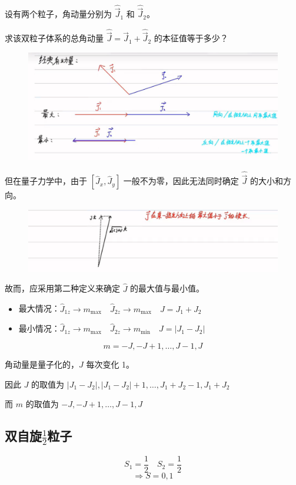 \documentclass[lang=cn,10pt]{elegantbook}
\begin{document}
设有两个粒子，角动量分别为 $\hat{\vec{J}}_1$ 和 $\hat{\vec{J}}_2$。

求该双粒子体系的总角动量 $\hat{\vec{J}} = \hat{\vec{J}}_1 + \hat{\vec{J}}_2$ 的本征值等于多少？

\begin{figure}[H]
	\centering
	\includegraphics[width=0.7\linewidth]{figure/screenshot0029}
\end{figure}

但在量子力学中，由于 $[\hat{J}_x, \hat{J}_y]$ 一般不为零，因此无法同时确定 $\hat{\vec{J}}$ 的大小和方向。

\begin{figure}[H]
	\centering
	\includegraphics[width=0.7\linewidth]{figure/screenshot0030}
\end{figure}

故而，应采用第二种定义来确定 $\hat{J}$ 的最大值与最小值。

\begin{itemize}
	\item 最大情况：\quad $\hat{J}_{1z} \rightarrow m_{\text{max}} \quad \hat{J}_{2z} \rightarrow m_{\text{max}} \quad J = J_1 + J_2$
	\item 最小情况：\quad $\hat{J}_{1z} \rightarrow m_{\text{max}} \quad \hat{J}_{2z} \rightarrow m_{\text{min}} \quad J = |J_1 - J_2|$
\end{itemize}

\[
m = -J, -J+1, \ldots, J-1, J
\]

角动量是量子化的，$J$ 每次变化 1。

因此 $J$ 的取值为 $|J_1 - J_2|, |J_1 - J_2| + 1, \ldots, J_1 + J_2 - 1, J_1 + J_2$

而 $m$ 的取值为 $-J, -J+1, \ldots, J-1, J$

\subsection{双自旋$\frac{1}{2}$粒子}
\[
S_1 = \frac{1}{2} \quad S_2 = \frac{1}{2}
\]
\[
\Rightarrow S = 0, 1
\]
\end{document}
